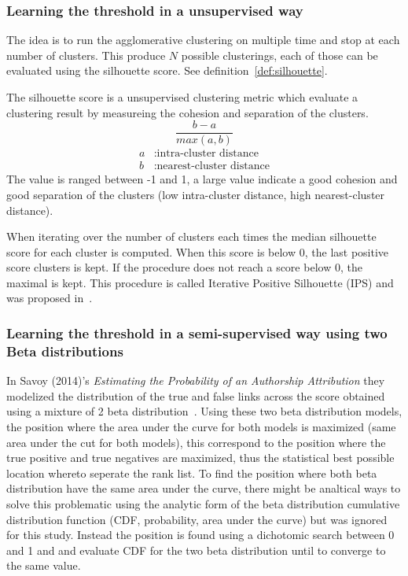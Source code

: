 \subsubsection{Learning the threshold in a unsupervised way}

The idea is to run the agglomerative clustering on multiple time and stop at each number of clusters.
This produce $N$ possible clusterings, each of those can be evaluated using the silhouette score.
See definition~\ref{def:silhouette}.

\begin{definition}
  \label{def:silhouette}
  The silhouette score is a unsupervised clustering metric which evaluate a clustering result by measureing the cohesion and separation of the clusters.
  \begin{equation}
    \frac{b - a}{max(a, b)}
  \end{equation}
  \begin{equation*}
    \begin{split}
      a&: \text{intra-cluster distance}\\
      b&: \text{nearest-cluster distance}
    \end{split}
  \end{equation*}
  The value is ranged between -1 and 1, a large value indicate a good cohesion and good separation of the clusters (low intra-cluster distance, high nearest-cluster distance).
\end{definition}

When iterating over the number of clusters each times the median silhouette score for each cluster is computed.
When this score is below 0, the last positive score clusters is kept.
If the procedure does not reach a score below 0, the maximal is kept.
This procedure is called Iterative Positive Silhouette (IPS) and was proposed in~\cite{automated_unsupervised}.

\subsubsection{Learning the threshold in a semi-supervised way using two Beta distributions}

In Savoy (2014)'s \textit{Estimating the Probability of an Authorship Attribution} they modelized the distribution of the true and false links across the score obtained using a mixture of 2 beta distribution~\cite{savoy_probability}.
Using these two beta distribution models, the position where the area under the curve for both models is maximized (same area under the cut for both models), this correspond to the position where the true positive and true negatives are maximized, thus the statistical best possible location whereto seperate the rank list.
To find the position where both beta distribution have the same area under the curve, there might be analtical ways to solve this problematic using the analytic form of the beta distribution cumulative distribution function (CDF, probability, area under the curve) but was ignored for this study.
Instead the position is found using a dichotomic search between 0 and 1 and and evaluate CDF for the two beta distribution until to converge to the same value.

